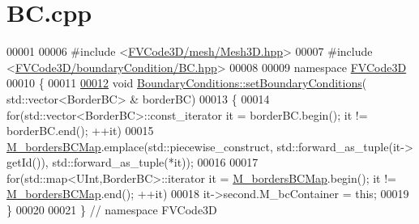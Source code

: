 \hypertarget{BC_8cpp_source}{}\section{B\+C.\+cpp}
\label{BC_8cpp_source}

\begin{DoxyCode}
00001 
00006 \textcolor{preprocessor}{#include <\hyperlink{Mesh3D_8hpp}{FVCode3D/mesh/Mesh3D.hpp}>}
00007 \textcolor{preprocessor}{#include <\hyperlink{BC_8hpp}{FVCode3D/boundaryCondition/BC.hpp}>}
00008 
00009 \textcolor{keyword}{namespace }\hyperlink{namespaceFVCode3D}{FVCode3D}
00010 \{
00011 
\hypertarget{BC_8cpp_source.tex_l00012}{}\hyperlink{classFVCode3D_1_1BoundaryConditions_ae368974020ff21456d0fef9ef9d8006d}{00012} \textcolor{keywordtype}{void} \hyperlink{classFVCode3D_1_1BoundaryConditions_ae368974020ff21456d0fef9ef9d8006d}{BoundaryConditions::setBoundaryConditions}(
      std::vector<BorderBC> & borderBC)
00013 \{
00014         \textcolor{keywordflow}{for}(std::vector<BorderBC>::const\_iterator it = borderBC.begin(); it != borderBC.end(); ++it)
00015                 \hyperlink{classFVCode3D_1_1BoundaryConditions_a22895d7e9ca19c8eb4a5ee34d2ad8b17}{M\_bordersBCMap}.emplace(std::piecewise\_construct, std::forward\_as\_tuple(it->
      getId()), std::forward\_as\_tuple(*it));
00016 
00017         \textcolor{keywordflow}{for}(std::map<UInt,BorderBC>::iterator it = \hyperlink{classFVCode3D_1_1BoundaryConditions_a22895d7e9ca19c8eb4a5ee34d2ad8b17}{M\_bordersBCMap}.begin(); it != 
      \hyperlink{classFVCode3D_1_1BoundaryConditions_a22895d7e9ca19c8eb4a5ee34d2ad8b17}{M\_bordersBCMap}.end(); ++it)
00018                 it->second.M\_bcContainer = \textcolor{keyword}{this};
00019 \}
00020 
00021 \} \textcolor{comment}{// namespace FVCode3D}
\end{DoxyCode}
